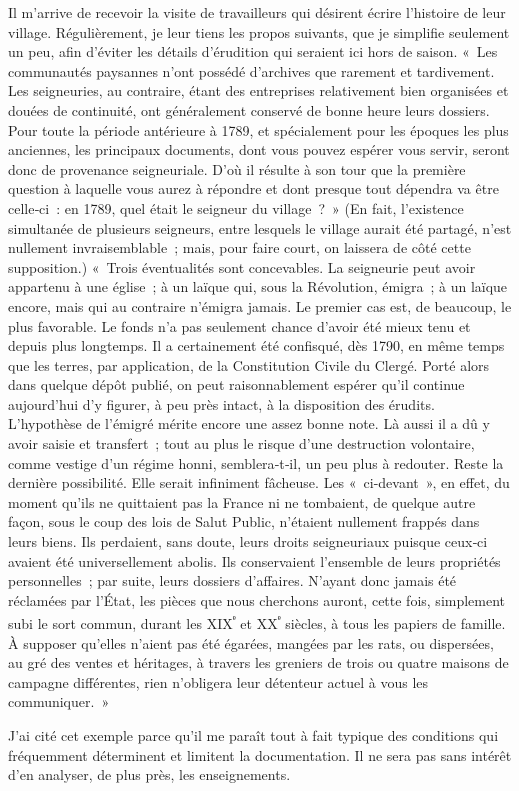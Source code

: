 \documentclass[french,twoside]{book} %
\begin{document}
\noindent Il m’arrive de recevoir la visite de travailleurs qui désirent écrire l’his­toire de leur village. Régulièrement, je leur tiens les propos suivants, que je simplifie seulement un peu, afin d’éviter les détails d’érudition qui seraient ici hors de saison. « Les communautés paysannes n’ont pos­sédé d’archives que rarement et tardivement. Les seigneuries, au con­traire, étant des entreprises relativement bien organisées et douées de continuité, ont généralement conservé de bonne heure leurs dossiers. Pour toute la période antérieure à 1789, et spécialement pour les époques les plus anciennes, les principaux documents, dont vous pouvez espérer vous servir, seront donc de provenance seigneuriale. D’où il résulte à son tour que la première question à laquelle vous aurez à répondre et dont presque tout dépendra va être celle‑ci : en 1789, quel était le seigneur du village ? » (En fait, l’existence simultanée de plusieurs seigneurs, entre lesquels le village aurait été partagé, n’est nullement invraisemblable ; mais, pour faire court, on laissera de côté cette supposition.) « Trois éven­tualités sont concevables. La seigneurie peut avoir appartenu à une église ; à un laïque qui, sous la Révolution, émigra ; à un laïque encore, mais qui au contraire n’émigra jamais. Le premier cas est, de beaucoup, le plus favorable. Le fonds n’a pas seulement chance d’avoir été mieux tenu et depuis plus longtemps. Il a certainement été confisqué, dès 1790, en même temps que les terres, par application, de la Constitution Civile du Clergé. Porté alors dans quelque dépôt publié, on peut raisonnablement espérer qu’il continue aujourd’hui d’y figurer, à peu près intact, à la disposition des érudits. L’hypothèse de l’émigré mérite encore une assez bonne note. Là aussi il a dû y avoir saisie et transfert ; tout au plus le risque d’une destruction volontaire, comme vestige d’un régime honni, semblera‑t‑il, un peu plus à redouter. Reste la dernière possibilité. Elle  
\label{p31} serait infiniment fâcheuse. Les « ci-devant », en effet, du moment qu’ils ne quittaient pas la France ni ne tombaient, de quelque autre façon, sous le coup des lois de Salut Public, n’étaient nullement frappés dans leurs biens. Ils perdaient, sans doute, leurs droits seigneuriaux puisque ceux‑ci avaient été universellement abolis. Ils conservaient l’ensemble de leurs propriétés personnelles ; par suite, leurs dossiers d’affaires. N’ayant donc jamais été réclamées par l’État, les pièces que nous cherchons auront, cette fois, simplement subi le sort commun, durant les XIX\textsuperscript{ᵉ} et XX\textsuperscript{ᵉ} siècles, à tous les papiers de famille. À supposer qu’elles n’aient pas été égarées, mangées par les rats, ou dispersées, au gré des ventes et héritages, à travers les greniers de trois ou quatre maisons de campagne différentes, rien n’obligera leur détenteur actuel à vous les communiquer. »\par
J’ai cité cet exemple parce qu’il me paraît tout à fait typique des condi­tions qui fréquemment déterminent et limitent la documentation. Il ne sera pas sans intérêt d’en analyser, de plus près, les enseignements.\par
\end{document}
